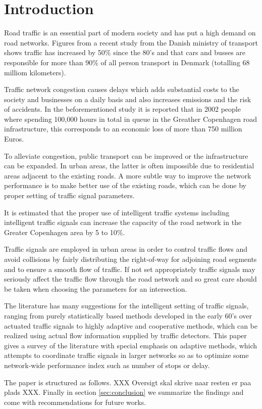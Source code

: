\section{Introduction}

Road traffic is an essential part of modern society and has put a high
demand on road networks. Figures from a recent study from the Danish
ministry of transport \cite{47} shows traffic has increased by 50\%
since the 80's and that cars and busses are responsible for more than
90\% of all person transport in Denmark (totalling 68 milliom
kilometers).

Traffic network congestion causes delays which adds substantial costs
to the society and businesses on a daily basis and also increases
emissions and the risk of accidents. In the beforementioned study it
is reported that in 2002 people where spending 100,000 hours in total
in queue in the Greather Copenhagen road infrastructure, this
corresponds to an economic loss of more than 750 million Euros.  

To alleviate congestion, public transport can be improved or the
infrastructure can be expanded. In urban areas, the latter is often
impossible due to residential areas adjacent to the existing roads.
A more subtle way to improve the network performance is to make better
use of the existing roads, which can be done by proper setting of
traffic signal parameters.

It is estimated that the proper use of intelligent traffic systems
including intelligent traffic signals can increase the capacity of the
road network in the Greater Copenhagen area by 5 to 10\%.

Traffic signals are employed in urban areas in order to control
traffic flows and avoid collisions by fairly distributing the
right-of-way for adjoining road segments and to ensure a smooth flow
of traffic. If not set appropriately traffic signals may seriously
affect the traffic flow through the road network and so great care
should be taken when choosing the parameters for an intersection.

The literature has many suggestions for the intelligent setting of
traffic signals, ranging from purely statistically based methods
developed in the early 60's over actuated traffic signals to highly
adaptive and cooperative methods, which can be realized using actual
flow information supplied by traffic detectors. This paper gives a
survey of the literature with special emphasis on adaptive methods,
which attempts to coordinate traffic signals in larger networks so as
to optimize some network-wide performance index such as number of
stops or delay.

The paper is structured as follows. XXX Oversigt skal skrive naar
resten er paa plads XXX. Finally in section \ref{sec:conclusion} we
summarize the findings and come with recommendations for future works.
